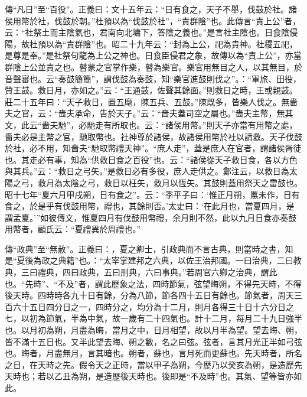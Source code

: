 {\noindent\zhuan{}\fzbyks 傳“凡日”至“百役”。正義曰：文十五年云：“日有食之，天子不舉，伐鼓於社。諸侯用幣於社，伐鼓於朝。”杜預以為“伐鼓於社”，“責群陰”也。此傳言“責上公”者，云：“社祭土而主陰氣也，君南向北墉下，答陰之義也。”是言社主陰也。日食陰侵陽，故杜預以為“責群陰”也。昭二十九年云：“封為上公，祀為貴神。社稷五祀，是尊是奉。”是社祭句龍為上公之神也。日食臣侵君之象，故傳以為“責上公”，亦當群陰上公並責之也。瞽蒙之官掌作樂，瞽為樂官。樂官用無目之人，以其無目，於音聲審也。云“奏鼓簡簡”，謂伐鼓為奏鼓，知“樂官進鼓則伐之”。：“軍旅、田役，贊王鼓。救日月，亦如之。”云：“王通鼓，佐聲其餘面。”則救日之時，王或親鼓。莊二十五年曰：“天子救日，置五麾，陳五兵、五鼓。”陳既多，皆樂人伐之。無嗇夫之官，云：“嗇夫承命，告於天子。”云：“嗇夫蓋司空之屬也。”嗇夫主幣，無其文，此云“嗇夫馳”，必馳走有所取也。云：“諸侯用幣。”則天子亦當有用幣之處，嗇夫必是主幣之官，馳取幣也。社神尊於諸侯，故諸侯用幣於社以請救。天子伐鼓於社，必不用，知嗇夫“馳取幣禮天神”。“庶人走”，蓋是庶人在官者，謂諸侯胥徒也。其走必有事，知為“供救日食之百役”也。云：“諸侯從天子救日食，各以方色與其兵。”云：“救日之弓矢。”是救日必有多役，庶人走供之。鄭注云，以救日為太陽之弓，救月為太陰之弓，救日以枉矢，救月以恆矢。其鼓則蓋用祭天之雷鼓也。昭十七年“夏六月甲戌朔，日有食之”。云：“季平子曰：‘惟正月朔，慝未作，日有食之，於是乎有伐鼓用幣，禮也，其餘則否。’太史曰：‘在此月也，當夏四月，是謂孟夏。’”如彼傳文，惟夏四月有伐鼓用幣禮，余月則不然，此以九月日食亦奏鼓用幣者，顧氏云：“夏禮異於周禮也。” \par}

{\noindent\zhuan{}\fzbyks 傳“政典”至“無赦”。正義曰：，夏之卿士，引政典而不言古典，則當時之書，知是“夏後為政之典籍”也。：“太宰掌建邦之六典，以佐王治邦國。一曰治典，二曰教典，三曰禮典，四曰政典，五曰刑典，六曰事典。”若周官六卿之治典，謂此也。“先時”、“不及”者，謂此歷象之法，四時節氣，弦望晦朔，不得先天時，不得後天時。四時時各九十日有餘，分為八節，節各四十五日有餘也。節氣者，周天三百六十五日四分日之一，四時分之，均分為十二月，則月各得三十日十六分日之七，以初為節氣，半為中氣，故一歲有二十四氣也。計十二月，每月二十九日強半也。以月初為朔，月盡為晦，當月之中，日月相望，故以月半為望。望去晦、朔，皆不滿十五日也。又半此望去晦、朔之數，名之曰弦。弦者，言其月光正半如弓弦也。晦者，月盡無月，言其暗也。朔者，蘇也，言月死而更蘇也。先天時者，所名之日，在天時之先。假令天之正時，當以甲子為朔，今歷乃以癸亥為朔，是造歷先天時也；若以乙丑為朔，是造歷後天時也。後即是“不及時”也。其氣、望等皆亦如此。 \par}

